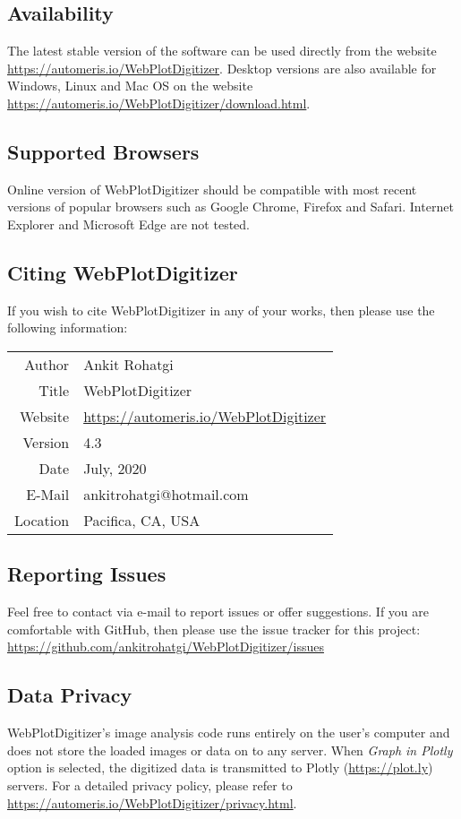 \documentclass[letterpaper, 11pt]{article}
\begin{document}
\subsection{Availability}
The latest stable version of the software can be used directly from the website \url{https://automeris.io/WebPlotDigitizer}. Desktop versions are also available for Windows, Linux and Mac OS on the website \url{https://automeris.io/WebPlotDigitizer/download.html}.

\subsection{Supported Browsers}
Online version of WebPlotDigitizer should be compatible with most recent versions of popular browsers such as Google Chrome, Firefox and Safari. Internet Explorer and Microsoft Edge are not tested.

\subsection{Citing WebPlotDigitizer}
If you wish to cite WebPlotDigitizer in any of your works, then please use the following information:

\begin{center}
\begin{tabular}{|r|l|}
\hline
Author & Ankit Rohatgi\\
Title & WebPlotDigitizer\\
Website & \url{https://automeris.io/WebPlotDigitizer}\\
Version & 4.3\\
Date & July, 2020\\
E-Mail & ankitrohatgi@hotmail.com\\
Location & Pacifica, CA, USA\\
\hline
\end{tabular}
\end{center}

\subsection{Reporting Issues}
Feel free to contact via e-mail to report issues or offer suggestions. If you are comfortable with GitHub, then please use the issue tracker for this project: \url{https://github.com/ankitrohatgi/WebPlotDigitizer/issues}

\subsection{Data Privacy}
WebPlotDigitizer's image analysis code runs entirely on the user's computer and does not store the loaded images or data on to any server. When \emph{Graph in Plotly} option is selected, the digitized data is transmitted to Plotly (\url{https://plot.ly}) servers. For a detailed privacy policy, please refer to \url{https://automeris.io/WebPlotDigitizer/privacy.html}.
\end{document}
